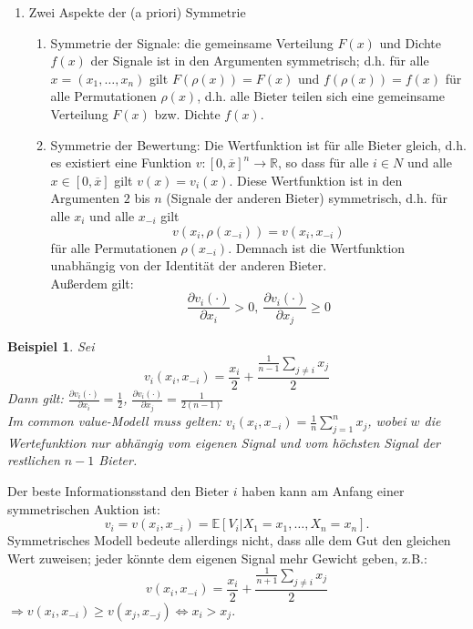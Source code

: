 \documentclass[12pt]{extreport} %
\theoremstyle{named}
\theoremstyle{nnamed}
\theoremstyle{itshape}
\theoremstyle{normal}
\newtheorem{beispiel}[unnamedtheorem]{Beispiel}
\begin{document}
\begin{enumerate}[label=\alph*\upshape)]
	\item Zwei Aspekte der (a priori) Symmetrie
		\begin{enumerate}[label=\arabic*.]
			\item Symmetrie der Signale: die gemeinsame Verteilung $F(x)$ und Dichte $f(x)$ der Signale ist in den Argumenten symmetrisch; d.h. für alle $x = (x_1, \dotsc, x_n)$ gilt $F(\rho(x)) = F(x)$ und $f(\rho(x)) = f(x)$ für alle Permutationen $\rho(x)$, d.h. alle Bieter teilen sich eine gemeinsame Verteilung $F(x)$ bzw. Dichte $f(x)$.
			\item Symmetrie der Bewertung: Die Wertfunktion ist für alle Bieter gleich, d.h. es existiert eine Funktion $v \colon [0, \overline{x}]^n \rightarrow \mathbb{R}$, so dass für alle $i \in N$ und alle $x \in [0, \overline{x}]$ gilt $v(x) = v_i(x)$. Diese Wertfunktion ist in den Argumenten $2$ bis $n$ (Signale der anderen Bieter) symmetrisch, d.h. für alle $x_i$ und alle $x_{-i}$ gilt
				$$ v\left(x_i, \rho(x_{-i}) \right) = v\left(x_i, x_{-i} \right) $$
				für alle Permutationen $\rho(x_{-i})$. Demnach ist die Wertfunktion unabhängig von der Identität der anderen Bieter. ~\\
				
				Außerdem gilt: 
				$$ \frac{\partial v_{i}(\cdot)}{\partial x_{i}} > 0, ~\frac{\partial v_{i}(\cdot)}{\partial x_{j}} \geq 0 $$		
		\end{enumerate}
\end{enumerate}


\begin{beispiel} Sei
	$$ v_{i}(x_{i}, x_{-i}) = \frac{x_{i}}{2} + \frac{\frac{1}{n-1} \sum_{j \neq i} x_{j}}{2}$$
	Dann gilt: $\frac{\partial v_{i}(\cdot)}{\partial x_{i}} = \frac{1}{2}$, $\frac{\partial v_{i}(\cdot)}{\partial x_{j}} = \frac{1}{2(n-1)}$ ~\\
					
	Im common value-Modell muss gelten: $v_{i}(x_{i}, x_{-i}) = \frac{1}{n} \sum_{j=1}^{n} x_{j}$, wobei $w$ die Wertefunktion nur abhängig vom eigenen Signal und vom höchsten Signal der restlichen $n-1$ Bieter.
\end{beispiel}	


Der beste Informationsstand den Bieter $i$ haben kann am Anfang einer symmetrischen Auktion ist:
	$$ v_{i} = v(x_{i}, x_{-i}) = \mathds{E}\left[V_{i} \big| X_1 = x_1, \dotsc, X_n = x_n \right]. $$
Symmetrisches Modell bedeute allerdings nicht, dass alle dem Gut den gleichen Wert zuweisen; jeder könnte dem eigenen Signal mehr Gewicht geben, z.B.:
$$ v(x_i, x_{-i}) = \frac{x_{i}}{2} + \frac{\frac{1}{n+1}\sum_{j \neq i} x_{j}}{2} $$
$\Rightarrow v(x_{i}, x_{-i}) \geq v(x_{j}, x_{-j}) \iff x_{i} > x_{j}$. 
\end{document}
